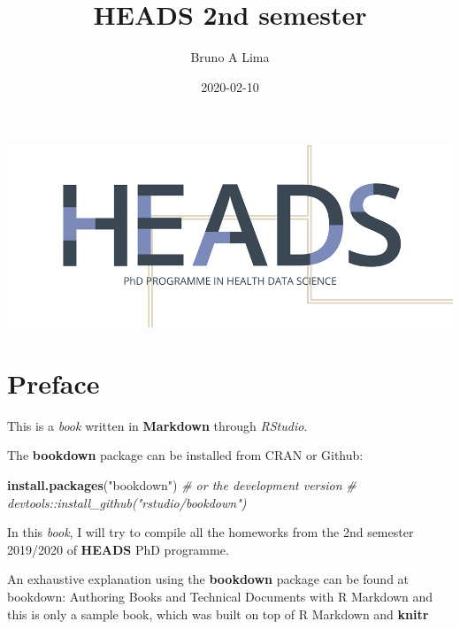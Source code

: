 \documentclass[]{book}
\title{HEADS 2nd semester}
\author{Bruno A Lima}
\date{2020-02-10}
\newenvironment{Shaded}{\begin{snugshade}}{\end{snugshade}}
\newcommand{\CommentTok}[1]{\textcolor[rgb]{0.56,0.35,0.01}{\textit{#1}}}
\newcommand{\KeywordTok}[1]{\textcolor[rgb]{0.13,0.29,0.53}{\textbf{#1}}}
\newcommand{\NormalTok}[1]{#1}
\newcommand{\StringTok}[1]{\textcolor[rgb]{0.31,0.60,0.02}{#1}}
\begin{document}
\maketitle

{
\setcounter{tocdepth}{1}
\tableofcontents
}
\hypertarget{section}{%
\chapter*{}\label{section}}

\includegraphics{images/heads.png}

\hypertarget{preface}{%
\chapter*{Preface}\label{preface}}

This is a \emph{book} written in \textbf{Markdown} through \emph{RStudio}.

The \textbf{bookdown} package \citep{xie2015} can be installed from CRAN or Github:

\begin{Shaded}
\begin{Highlighting}[]
\KeywordTok{install.packages}\NormalTok{(}\StringTok{"bookdown"}\NormalTok{)}
\CommentTok{# or the development version}
\CommentTok{# devtools::install_github("rstudio/bookdown")}
\end{Highlighting}
\end{Shaded}

In this \emph{book}, I will try to compile all the homeworks from the 2nd semester 2019/2020 of \textbf{HEADS} PhD programme.

An exhaustive explanation using the \textbf{bookdown} package \citep{R-bookdown} can be found at bookdown: Authoring Books and Technical Documents with R Markdown and this is only a sample book, which was built on top of R Markdown and \textbf{knitr}
\end{document}
